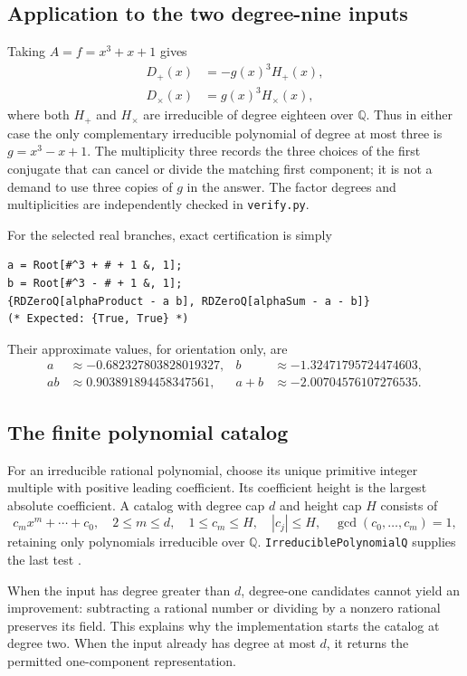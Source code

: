 \documentclass[11pt,letterpaper]{article}
\theoremstyle{definition}
\newcommand{\Q}{\mathbb Q}
\newcommand{\code}[1]{\texttt{#1}}
\begin{document}
\subsection{Application to the two degree-nine inputs}
Taking $A=f=x^3+x+1$ gives
\begin{align}
 D_+(x)&=-g(x)^3H_+(x),\\
 D_{\times}(x)&=g(x)^3H_{\times}(x),
\end{align}
where both $H_+$ and $H_{\times}$ are irreducible of degree eighteen over $\Q$. Thus in either case the only complementary irreducible polynomial of degree at most three is $g=x^3-x+1$. The multiplicity three records the three choices of the first conjugate that can cancel or divide the matching first component; it is not a demand to use three copies of $g$ in the answer. The factor degrees and multiplicities are independently checked in \code{verify.py}.

For the selected real branches, exact certification is simply
\begin{samepage}
\begin{lstlisting}
a = Root[#^3 + # + 1 &, 1];
b = Root[#^3 - # + 1 &, 1];
{RDZeroQ[alphaProduct - a b], RDZeroQ[alphaSum - a - b]}
(* Expected: {True, True} *)
\end{lstlisting}
\end{samepage}
Their approximate values, for orientation only, are
\begin{align*}
 a&\approx-0.682327803828019327,&
 b&\approx-1.32471795724474603,\\
 ab&\approx0.903891894458347561,&
 a+b&\approx-2.00704576107276535.
\end{align*}

\subsection{The finite polynomial catalog}
For an irreducible rational polynomial, choose its unique primitive integer multiple with positive leading coefficient. Its coefficient height is the largest absolute coefficient. A catalog with degree cap $d$ and height cap $H$ consists of
\[
 c_mx^m+\cdots+c_0,\quad
 2\le m\le d,\quad 1\le c_m\le H,\quad |c_j|\le H,\quad
 \gcd(c_0,\ldots,c_m)=1,
\]
retaining only polynomials irreducible over $\Q$. \code{IrreduciblePolynomialQ} supplies the last test \cite{irreducible}.

When the input has degree greater than $d$, degree-one candidates cannot yield an improvement: subtracting a rational number or dividing by a nonzero rational preserves its field. This explains why the implementation starts the catalog at degree two. When the input already has degree at most $d$, it returns the permitted one-component representation.
\end{document}
